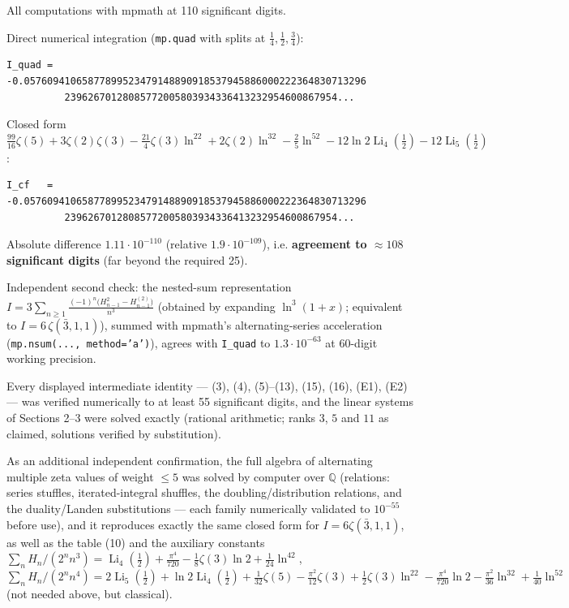 \documentclass[11pt]{article}
\theoremstyle{remark}
\begin{document}
All computations with mpmath at 110 significant digits.

Direct numerical integration (\texttt{mp.quad} with splits at $\tfrac14,\tfrac12,\tfrac34$):
\begin{verbatim}
I_quad = -0.05760941065877899523479148890918537945886000222364830713296
          23962670128085772005803934336413232954600867954...
\end{verbatim}
Closed form $\frac{99}{16}\zeta(5)+3\zeta(2)\zeta(3)-\frac{21}{4}\zeta(3)\ln^22+2\zeta(2)\ln^32
-\frac25\ln^52-12\ln2\operatorname{Li}_4(\frac12)-12\operatorname{Li}_5(\frac12)$:
\begin{verbatim}
I_cf   = -0.05760941065877899523479148890918537945886000222364830713296
          23962670128085772005803934336413232954600867954...
\end{verbatim}
Absolute difference $1.11\cdot10^{-110}$ (relative $1.9\cdot10^{-109}$), i.e. \textbf{agreement to
$\approx108$ significant digits} (far beyond the required 25).

Independent second check: the nested-sum representation
$I=3\sum_{n\ge1}\frac{(-1)^n\big(H_{n-1}^2-H_{n-1}^{(2)}\big)}{n^3}$
(obtained by expanding $\ln^3(1+x)$; equivalent to $I=6\,\zeta(\bar3,1,1)$), summed with mpmath's
alternating-series acceleration (\texttt{mp.nsum(..., method='a')}), agrees with \texttt{I\_quad} to
$1.3\cdot10^{-63}$ at 60-digit working precision.

Every displayed intermediate identity --- (3), (4), (5)--(13), (15), (16), (E1), (E2) --- was verified
numerically to at least 55 significant digits, and the linear systems of Sections 2--3 were solved
exactly (rational arithmetic; ranks $3$, $5$ and $11$ as claimed, solutions verified by
substitution).

As an additional independent confirmation, the full algebra of alternating multiple zeta values of
weight $\le5$ was solved by computer over $\mathbb{Q}$ (relations: series stuffles, iterated-integral
shuffles, the doubling/distribution relations, and the duality/Landen substitutions --- each family
numerically validated to $10^{-55}$ before use), and it reproduces exactly the same closed form for
$I=6\zeta(\bar3,1,1)$, as well as the table (10) and the auxiliary constants
$\sum_n H_n/(2^nn^3)=\operatorname{Li}_4(\tfrac12)+\tfrac{\pi^4}{720}-\tfrac18\zeta(3)\ln2+\tfrac1{24}\ln^42$,
$\sum_n H_n/(2^nn^4)=2\operatorname{Li}_5(\tfrac12)+\ln2\operatorname{Li}_4(\tfrac12)
+\tfrac1{32}\zeta(5)-\tfrac{\pi^2}{12}\zeta(3)+\tfrac12\zeta(3)\ln^22-\tfrac{\pi^4}{720}\ln2
-\tfrac{\pi^2}{36}\ln^32+\tfrac1{40}\ln^52$ (not needed above, but classical).
\end{document}
